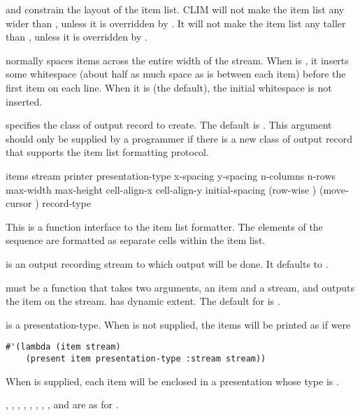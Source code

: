  and  constrain the layout of the item list.
CLIM will not make the item list any wider than , unless it is
overridden by .  It will not make the item list any taller than
, unless it is overridden by .

 normally spaces items across the entire width of the
stream.  When  is , it inserts some whitespace
(about half as much space as is between each item) before the first item on each
line.  When it is  (the default), the initial whitespace is not
inserted.

 specifies the class of output record to create.  The default
is .  This argument should only be
supplied by a programmer if there is a new class of output record that supports
the item list formatting protocol.


 {items \key stream printer presentation-type
                                  x-spacing y-spacing
                                  n-columns n-rows
                                  max-width max-height
                                  cell-align-x cell-align-y
                                  initial-spacing (row-wise )
                                  (move-cursor ) record-type}

This is a function interface to the item list formatter.  The elements of the
sequence  are formatted as separate cells within the item list.

 is an output recording stream to which output will be done.  It
defaults to .

 must be a function that takes two arguments, an item and a stream,
and outputs the item on the stream.   has dynamic extent.  The
default for  is .

 is a presentation-type.  When  is not
supplied, the items will be printed as if  were
\begin{verbatim}
#'(lambda (item stream)
    (present item presentation-type :stream stream))
\end{verbatim}
When  is supplied, each item will be enclosed in a presentation
whose type is .

, , , ,
, , , , and
 are as for .

